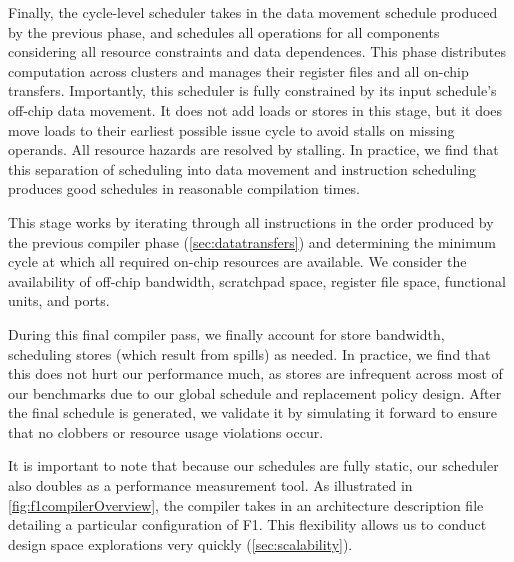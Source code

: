 Finally, the cycle-level scheduler takes in the data movement schedule produced
by the previous phase, and schedules all operations for all components
considering all resource constraints and data dependences. This phase
distributes computation across clusters and manages their register files and
all on-chip transfers. Importantly, this scheduler is fully constrained by its
input schedule's off-chip data movement. It does not add loads or stores in
this stage, but it does move loads to their earliest possible issue cycle to
avoid stalls on missing operands. All resource hazards are resolved by
stalling. In practice, we find that this separation of scheduling into data
movement and instruction scheduling produces good schedules in reasonable
compilation times.

This stage works by iterating through all instructions in the order produced by
the previous compiler phase (\autoref{sec:datatransfers}) and determining the
minimum cycle at which all required on-chip resources are available. We
consider the availability of off-chip bandwidth, scratchpad space, register
file space, functional units, and ports.

During this final compiler pass, we finally account for store bandwidth,
scheduling stores (which result from spills) as needed. In practice, we find
that this does not hurt our performance much, as stores are infrequent across
most of our benchmarks due to our global schedule and replacement policy
design. After the final schedule is generated, we validate it by simulating it
forward to ensure that no clobbers or resource usage violations occur.

It is important to note that because our schedules are fully static, our
scheduler also doubles as a performance measurement tool. As illustrated in
\autoref{fig:f1compilerOverview}, the compiler takes in an architecture
description file detailing a particular configuration of F1. This flexibility
allows us to conduct design space explorations very quickly
(\autoref{sec:scalability}).
